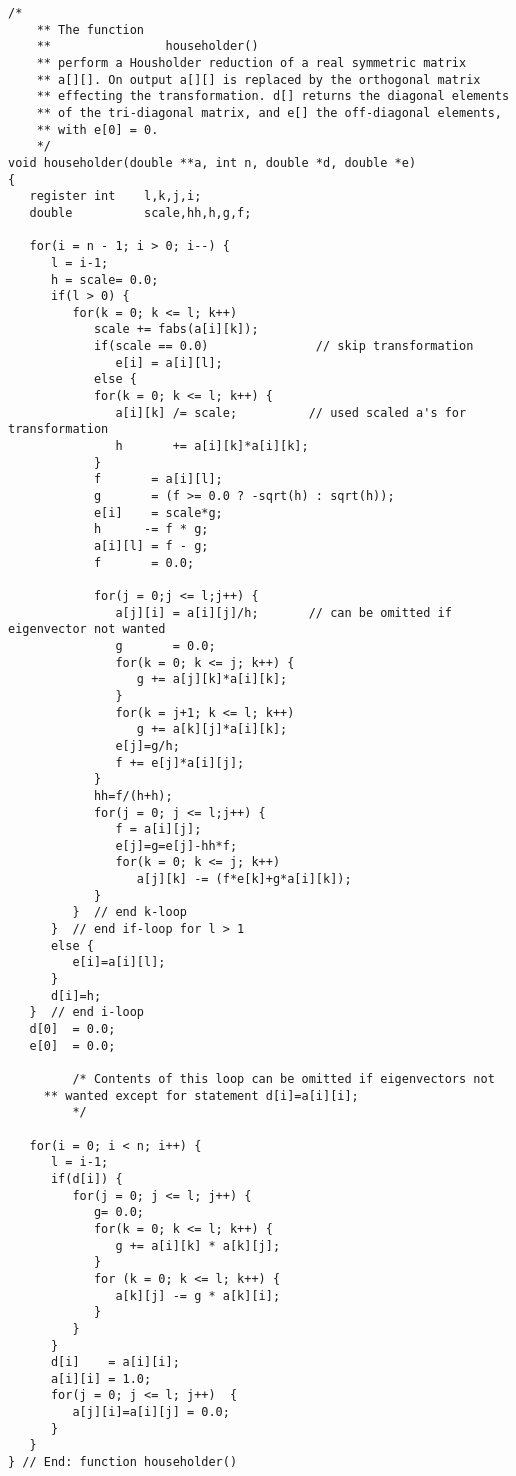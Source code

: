 \begin{lstlisting}[title={\url{http://folk.uio.no/compphys/programs/chapter07/cpp/householder.cpp}}]
    /*
    ** The function
    **                householder()
    ** perform a Housholder reduction of a real symmetric matrix
    ** a[][]. On output a[][] is replaced by the orthogonal matrix 
    ** effecting the transformation. d[] returns the diagonal elements
    ** of the tri-diagonal matrix, and e[] the off-diagonal elements, 
    ** with e[0] = 0.
    */
void householder(double **a, int n, double *d, double *e)
{
   register int    l,k,j,i;
   double          scale,hh,h,g,f;

   for(i = n - 1; i > 0; i--) {
      l = i-1;
      h = scale= 0.0;
      if(l > 0) {
         for(k = 0; k <= l; k++)
            scale += fabs(a[i][k]);
            if(scale == 0.0)               // skip transformation
               e[i] = a[i][l];
            else {
            for(k = 0; k <= l; k++) {
               a[i][k] /= scale;          // used scaled a's for transformation
               h       += a[i][k]*a[i][k];
            }
            f       = a[i][l];
            g       = (f >= 0.0 ? -sqrt(h) : sqrt(h));
            e[i]    = scale*g;
            h      -= f * g;
            a[i][l] = f - g;
            f       = 0.0;

            for(j = 0;j <= l;j++) {
               a[j][i] = a[i][j]/h;       // can be omitted if eigenvector not wanted
               g       = 0.0; 
               for(k = 0; k <= j; k++) {
                  g += a[j][k]*a[i][k];
               }
               for(k = j+1; k <= l; k++)
                  g += a[k][j]*a[i][k];
               e[j]=g/h;
               f += e[j]*a[i][j];
            }
            hh=f/(h+h);
            for(j = 0; j <= l;j++) {
               f = a[i][j];
               e[j]=g=e[j]-hh*f;
               for(k = 0; k <= j; k++)
                  a[j][k] -= (f*e[k]+g*a[i][k]);
            }
         }  // end k-loop
      }  // end if-loop for l > 1
      else {
         e[i]=a[i][l];
      }
      d[i]=h;
   }  // end i-loop
   d[0]  = 0.0;
   e[0]  = 0.0;

         /* Contents of this loop can be omitted if eigenvectors not
	 ** wanted except for statement d[i]=a[i][i];
         */

   for(i = 0; i < n; i++) {
      l = i-1;
      if(d[i]) {
         for(j = 0; j <= l; j++) {
            g= 0.0;
            for(k = 0; k <= l; k++) {
               g += a[i][k] * a[k][j];
            }
            for (k = 0; k <= l; k++) {
               a[k][j] -= g * a[k][i];
            }
         }
      }
      d[i]    = a[i][i];
      a[i][i] = 1.0;
      for(j = 0; j <= l; j++)  {
         a[j][i]=a[i][j] = 0.0;
      }
   }
} // End: function householder()
\end{lstlisting}


